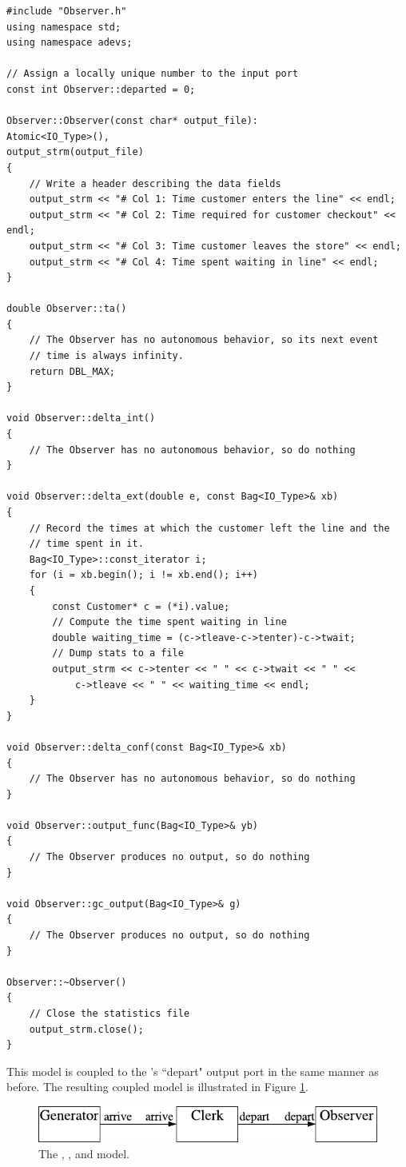 \begin{verbatim}
#include "Observer.h"
using namespace std;
using namespace adevs;

// Assign a locally unique number to the input port
const int Observer::departed = 0;

Observer::Observer(const char* output_file):
Atomic<IO_Type>(),
output_strm(output_file)
{
    // Write a header describing the data fields
    output_strm << "# Col 1: Time customer enters the line" << endl;
    output_strm << "# Col 2: Time required for customer checkout" << endl;
    output_strm << "# Col 3: Time customer leaves the store" << endl;
    output_strm << "# Col 4: Time spent waiting in line" << endl;
}

double Observer::ta()
{
    // The Observer has no autonomous behavior, so its next event
    // time is always infinity.
    return DBL_MAX;
}

void Observer::delta_int()
{
    // The Observer has no autonomous behavior, so do nothing
}

void Observer::delta_ext(double e, const Bag<IO_Type>& xb)
{
    // Record the times at which the customer left the line and the
    // time spent in it.
    Bag<IO_Type>::const_iterator i;
    for (i = xb.begin(); i != xb.end(); i++)
    {
        const Customer* c = (*i).value;
        // Compute the time spent waiting in line 
        double waiting_time = (c->tleave-c->tenter)-c->twait;
        // Dump stats to a file
        output_strm << c->tenter << " " << c->twait << " " <<
            c->tleave << " " << waiting_time << endl;
    }
}

void Observer::delta_conf(const Bag<IO_Type>& xb)
{
    // The Observer has no autonomous behavior, so do nothing
}

void Observer::output_func(Bag<IO_Type>& yb)
{
    // The Observer produces no output, so do nothing
}

void Observer::gc_output(Bag<IO_Type>& g)
{
    // The Observer produces no output, so do nothing
}

Observer::~Observer()
{
    // Close the statistics file
    output_strm.close();
}
\end{verbatim}

This model is coupled to the 's ``depart" output port in the same manner as before. The resulting coupled model is illustrated in Figure \ref{fig:complete_store_model}. 
\begin{figure}[ht]
\centering
\includegraphics{intro_figs/generator_and_clerk_and_observer.pdf}
\caption{The , , and  model.} 
\label{fig:complete_store_model}
\end{figure}

